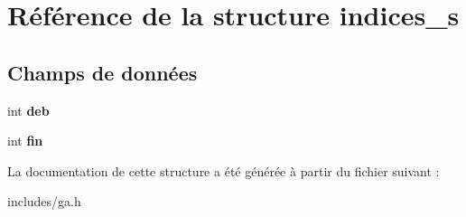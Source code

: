 \hypertarget{structindices__s}{}\section{Référence de la structure indices\+\_\+s}
\label{structindices__s}
\subsection*{Champs de données}
\begin{DoxyCompactItemize}
\item 
\mbox{\label{structindices__s_ab66784c7ac2b389e0567806ed6be814a}} 
int {\bfseries deb}
\item 
\mbox{\label{structindices__s_a5ac5068895029e9ee9ebcba09d244ec1}} 
int {\bfseries fin}
\end{DoxyCompactItemize}


La documentation de cette structure a été générée à partir du fichier suivant \+:\begin{DoxyCompactItemize}
\item 
includes/ga.\+h\end{DoxyCompactItemize}
